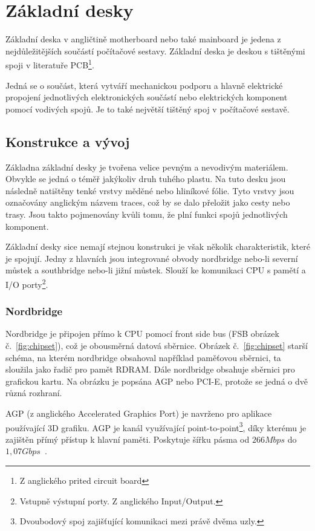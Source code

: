 \section{Základní desky}
Základní deska v angličtině motherboard nebo také mainboard je jedena z nejdůležitějších
součástí počítačové sestavy. Základní deska je deskou s tištěnými spoji v literatuře PCB\footnote{Z anglického prited circuit board}.

Jedná se o součást, která vytváří mechanickou podporu a hlavně elektrické propojení jednotlivých elektronických součástí
nebo elektrických komponent pomocí vodivých spojů. Je to také největší tištěný spoj v počítačové sestavě.

\subsection{Konstrukce a vývoj}
Základna základní desky je tvořena velice pevným a nevodivým materiálem. Obvykle se jedná
o téměř jakýkoliv druh tuhého plastu. Na tuto desku jsou následně natištěny tenké vrstvy
měděné nebo hliníkové fólie.\cite{ref:mb:study} Tyto vrstvy jsou označovány anglickým názvem traces,
což by se dalo přeložit jako cesty nebo trasy. Jsou takto pojmenovány kvůli tomu, že plní
funkci spojů jednotlivých komponent.

Základní desky sice nemají stejnou konstrukci je však několik charakteristik, které je spojují.
Jedny z hlavních jsou integrované obvody nordbridge nebo-li severní můstek a southbridge nebo-li jižní můstek.
Slouží ke komunikaci CPU s pamětí a I/O porty\footnote{Vstupně výstupní porty. Z anglického Input/Output.}.

\subsubsection{Nordbridge}
Nordbridge je připojen přímo k CPU pomocí front side bus (FSB obrázek
č.~\ref{fig:chipset}), což je obousměrná datová sběrnice.
Obrázek č.~\ref{fig:chipset} starší schéma, na kterém nordbridge obsahoval
například paměťovou sběrnici, ta sloužila jako řadič pro
pamět RDRAM. Dále nordbridge obsahuje sběrnici pro grafickou kartu. Na obrázku
je popsána AGP nebo PCI-E, protože se jedná o dvě různá rozhraní.

AGP (z anglického Accelerated Graphics Port) je navrženo pro aplikace
používající 3D grafiku. AGP je kanál využívající point-to-point\footnote{Dvoubodový
spoj zajišťující komunikaci mezi právě dvěma uzly.}, díky kterému
je zajištěn přímý přístup k hlavní paměti. Poskytuje šířku pásma
od $266 Mbps$ do $1,07 Gbps$~\cite{ref:mb:onlinecomputertips}.

